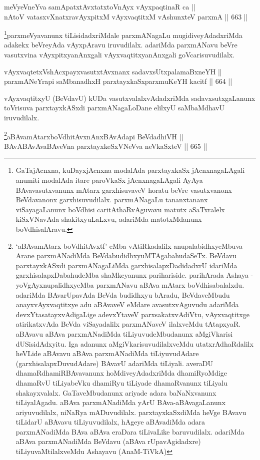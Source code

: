 \begin{shl}
meVyeVneYva samApatxtAvxtatxtoV\s nAyx vAyxpaqtinaR ca || \\
nAtoV vatasxvXnatxravAyxpitxM vAyxvaqtitxM vA\s shunxteV parxmA \hfill || 663 ||  
\end{shl}

\begin{artha}
\footnote{GaTajAcnxna, kuDayxjAcnxna modalAda parxtayxkaSx jAcnxnagaLAgali anumiti modalAda itare paroVkaSx jAcnxnagaLAgali AyAya BAvavasutxvanunx mAtarx garxhisuvaveV horatu beVre vasutxvanonx BeVdavanonx garxhisuvudilalx. parxmANagaLu tananxtananx viSayagaLanunx boVdhisi caritAthaRvAguvavu matutx aSaTxralelx kiSxVNavAda shakitxyuLaLxvu, adariMda matotxMdanunx boVdhisalAravu.}parxmeVyavanunx tiLisidadxriMdale parxmANagaLu mugidiveyAdadxriMda adakekx beVreyAda vAyxpAravu iruvudilalx. adariMda parxmANavu beVre vasutxvina vAyxpitxyanAnxgali vAyxvaqtitxyanAnxgali goVcarisuvudilalx.
\end{artha}

\begin{shl}
vAyxvaqtetxVshAcxpayxvasutxtAvxnanx sadavxsUtxpalamaBxneYH || \\
parxmANeYrapi saMbanadhxH parxtayxkaSxparxmuKeYH kacitf \hfill || 664 ||  
\end{shl}

\begin{artha}
vAyxvaqtitxyU (BeVdavU) kUDa vasutxvalalxvAdadxriMda 
sadavxsutxgaLanunx toVrisuva parxtayxkASxdi parxmANagaLoDane elilxyU 
saMbaMdhavU iruvudilalx.
\end{artha}


\begin{shl}
\footnote{`aBAvamAtarx boVdhitAvxtf' eMba vAtiRkadalilx 
anupalabidhxyeMbuva Arane parxmANadiMda BeVdabudidhxyuMTAgabahudaSeTx. 
BeVdavu parxtayxkASxdi parxmANagaLiMda garxhisalapxDadidadxrU idariMda 
garxhisalapxDabahudeMba shaMkeyanunx parihariside. parihArada Ashaya - 
yoVgAyxnupalidhxyeMba parxmANavu aBAva mAtarx boVdhisabalalxdu. 
adariMda BAvarUpavAda BeVda budidhxyu bAradu, BeVdaveMbudu 
anayxvAyxvaqtitxye adu aBAvaveV eMdare avasutxvAguvudu adariMda 
devxYtasatayxvAdigaLige adevxYtaveV parxsakatxvAdiVtu, vAyxvaqtitxge 
atirikatxvAda BeVda viSayadalilx parxmANaveV ilalxveMdu tAtapxyaR. 
aBAvavu aBAva parxmANadiMda tiLiyuvudeMbudanunx aMgiVkarisi 
dUSisidAdxyitu. Iga adanunx aMgiVkarisuvudilalxveMdu utatxrAdhaRdalilx 
heVLide \ndash  aBAvavu aBAva parxmANadiMda tiLiyuvudAdare 
(garxhisalapxDuvudAdare) BAvavU adariMda tiLiyali. averaDU 
dhamaRdhamiRBAvavanunx hoMdiveyAdadxriMda dhamiRyoMdige dhamaRvU 
tiLiyabeVku dhamiRyu tiLiyade dhamaRvanunx tiLiyalu shakayxvalalx. 
GaTaveMbudanunx ariyade adara baNaNxvanunx tiLiyalAgadu. aBAva 
parxmANadiMda yArU BAva-aBAvagaLanunx ariyuvudilalx, niNaRya 
mADuvudilalx. parxtayxkaSxdiMda heVge BAvavu tiLidarU aBAvavu 
tiLiyuvudilalx, hAgeye aBAvadiMda adara parxmANadiMda BAva aBAva 
eraDara tiLivaLike baruvudilalx. adariMda aBAva parxmANadiMda BeVdavu 
(aBAva rUpavAgidadxre) tiLiyuvaMtilalxveMdu Ashayavu (AnaM-TiVkA)}aBAvamAtarxboVdhitAvxnAnxBAvAdapi BeVdadhiVH || \\
BAvABAvAvaBAveVna parxtayxkeSxVNeVva neVkaSxteV \hfill || 665 ||  
\end{shl}

